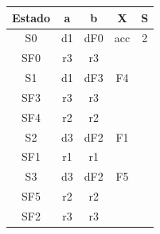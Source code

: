 \begin{problem}
\ppart
\begin{tabular}{| c | c | c | c | c | }
\hline
Estado  & a & b & X & S \\
\hline
S0 & d1 & dF0 & acc & 2\\
\hline
SF0 & r3  & r3 &  & \\
\hline
S1 & d1 & dF3 & F4 &  \\
\hline
SF3 & r3 & r3 &  & \\
\hline
SF4 & r2 & r2 &  &   \\
\hline
S2 & d3 & dF2 & F1 &  \\
\hline
SF1 & r1 & r1 &  &  \\
\hline
S3 & d3 & dF2 & F5 & \\
\hline
SF5 & r2 & r2 &  &  \\
\hline
SF2 & r3 & r3 &  &  \\
\hline
\end{tabular}


\end{problem}

